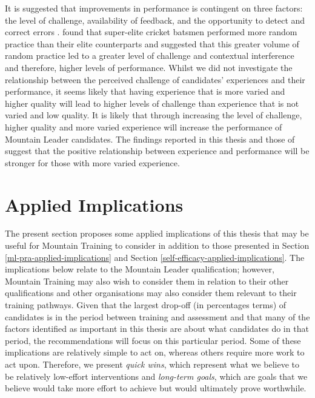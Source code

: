 \documentclass[
  12pt,
  a4paper,
]{book}
\begin{document}
It is suggested that improvements in performance is contingent on three factors: the level of challenge, availability of feedback, and the opportunity to detect and correct errors \citep{Ericsson1993, Guadagnoll2004}. \citet{Jones2020} found that super-elite cricket batsmen performed more random practice than their elite counterparts and suggested that this greater volume of random practice led to a greater level of challenge and contextual interference and therefore, higher levels of performance. Whilst we did not investigate the relationship between the perceived challenge of candidates' experiences and their performance, it seems likely that having experience that is more varied and higher quality will lead to higher levels of challenge than experience that is not varied and low quality. It is likely that through increasing the level of challenge, higher quality and more varied experience will increase the performance of Mountain Leader candidates. The findings reported in this thesis and those of \citet{Jones2020} suggest that the positive relationship between experience and performance will be stronger for those with more varied experience.

\hypertarget{gen-discussion-applied-implications}{%
\section{Applied Implications}\label{gen-discussion-applied-implications}}

The present section proposes some applied implications of this thesis that may be useful for Mountain Training to consider in addition to those presented in Section \ref{ml-pra-applied-implications} and Section \ref{self-efficacy-applied-implications}. The implications below relate to the Mountain Leader qualification; however, Mountain Training may also wish to consider them in relation to their other qualifications and other organisations may also consider them relevant to their training pathways. Given that the largest drop-off (in percentages terms) of candidates is in the period between training and assessment and that many of the factors identified as important in this thesis are about what candidates do in that period, the recommendations will focus on this particular period. Some of these implications are relatively simple to act on, whereas others require more work to act upon. Therefore, we present \emph{quick wins}, which represent what we believe to be relatively low-effort interventions and \emph{long-term goals}, which are goals that we believe would take more effort to achieve but would ultimately prove worthwhile.
\end{document}
